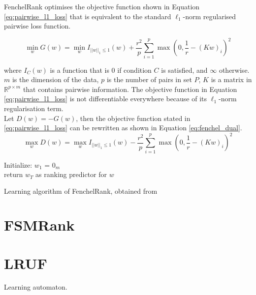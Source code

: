 FenchelRank optimises the objective function shown in Equation \ref{eq:pairwise_l1_loss} that is equivalent to the standard $\ell_1$-norm regularised pairwise loss function.

\begin{equation}
\min_w G(w) = \min_w I_{||w||_{1} \le 1}(w) + \frac{r^2}{p} \sum\limits_{i=1}^{p}\max(0,\frac{1}{r}-(Kw)_i)^2
\label{eq:pairwise_l1_loss}
\end{equation}

\noindent where $I_{C}(w)$ is a function that is 0 if condition $C$ is satisfied, and $\infty$ otherwise. $m$ is the dimension of the data, $p$ is the number of pairs in set $P$, $K$ is a matrix in $\mathbb{R}^{p \times m}$ that contains pairwise information. The objective function in Equation \ref{eq:pairwise_l1_loss} is not differentiable everywhere because of its $\ell_1$-norm regularisation term.\\

Let $D(w) = -G(w)$, then the objective function stated in \ref{eq:pairwise_l1_loss} can be rewritten as shown in Equation \ref{eq:fenchel_dual}.
\begin{equation}
\max_w D(w) = \max_w I_{||w||_{1} \le 1}(w) - \frac{r^2}{p} \sum\limits_{i=1}^{p}\max(0,\frac{1}{r}-(Kw)_i)^2
\label{eq:fenchel_dual}
\end{equation}


\LinesNumbered
\begin{algorithm}[H]
 Initialize: $w_1$ = $0_m$\\
 return $w_{T}$ as ranking predictor for $w$
 \caption{Learning algorithm of FenchelRank, obtained from \cite{Lai2013}}
 \label{alg:fenchelrank}
\end{algorithm}
\section{FSMRank}

\section{LRUF}
Learning automaton.